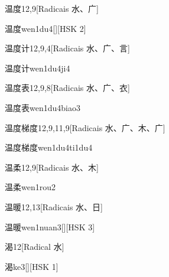 \begin{entry}{温度}{12,9}[Radicais ⽔、⼴]
  \begin{phonetics}{温度}{wen1du4}[][HSK 2]
  \end{phonetics}
\end{entry}

\begin{entry}{温度计}{12,9,4}[Radicais ⽔、⼴、⾔]
  \begin{phonetics}{温度计}{wen1du4ji4}
  \end{phonetics}
\end{entry}

\begin{entry}{温度表}{12,9,8}[Radicais ⽔、⼴、⾐]
  \begin{phonetics}{温度表}{wen1du4biao3}
  \end{phonetics}
\end{entry}

\begin{entry}{温度梯度}{12,9,11,9}[Radicais ⽔、⼴、⽊、⼴]
  \begin{phonetics}{温度梯度}{wen1du4ti1du4}
  \end{phonetics}
\end{entry}

\begin{entry}{温柔}{12,9}[Radicais ⽔、⽊]
  \begin{phonetics}{温柔}{wen1rou2}
  \end{phonetics}
\end{entry}

\begin{entry}{温暖}{12,13}[Radicais ⽔、⽇]
  \begin{phonetics}{温暖}{wen1nuan3}[][HSK 3]
  \end{phonetics}
\end{entry}

\begin{entry}{渴}{12}[Radical ⽔]
  \begin{phonetics}{渴}{ke3}[][HSK 1]
  \end{phonetics}
\end{entry}

